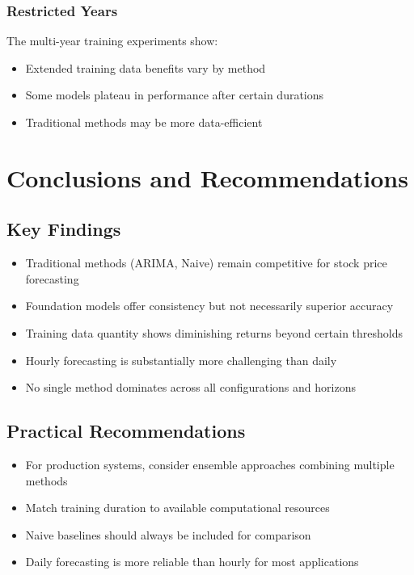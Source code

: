 \documentclass{article}
\begin{document}
\subsubsection{Restricted Years}
The multi-year training experiments show:
\begin{itemize}
\item Extended training data benefits vary by method
\item Some models plateau in performance after certain durations
\item Traditional methods may be more data-efficient
\end{itemize}

\section{Conclusions and Recommendations}

\subsection{Key Findings}
\begin{itemize}
\item Traditional methods (ARIMA, Naive) remain competitive for stock price forecasting
\item Foundation models offer consistency but not necessarily superior accuracy
\item Training data quantity shows diminishing returns beyond certain thresholds
\item Hourly forecasting is substantially more challenging than daily
\item No single method dominates across all configurations and horizons
\end{itemize}

\subsection{Practical Recommendations}
\begin{itemize}
\item For production systems, consider ensemble approaches combining multiple methods
\item Match training duration to available computational resources
\item Naive baselines should always be included for comparison
\item Daily forecasting is more reliable than hourly for most applications
\end{itemize}
\end{document}
